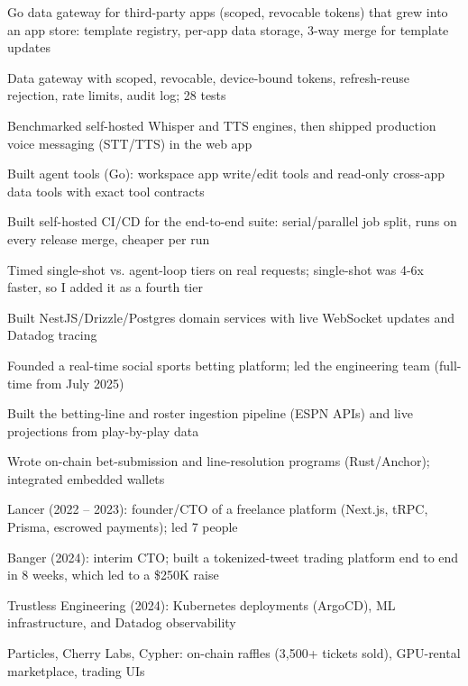\documentclass[print]{jack-resume}
\begin{document}
\begin{tightemize}
    \item Go data gateway for third-party apps (scoped, revocable tokens) that grew into an app store: template registry, per-app data storage, 3-way merge for template updates
    \item Data gateway with scoped, revocable, device-bound tokens, refresh-reuse rejection, rate limits, audit log; 28 tests
    \item Benchmarked self-hosted Whisper and TTS engines, then shipped production voice messaging (STT/TTS) in the web app
    \item Built agent tools (Go): workspace app write/edit tools and read-only cross-app data tools with exact tool contracts
    \item Built self-hosted CI/CD for the end-to-end suite: serial/parallel job split, runs on every release merge, cheaper per run
    \item Timed single-shot vs. agent-loop tiers on real requests; single-shot was 4-6x faster, so I added it as a fourth tier
\end{tightemize}
\sectionsep

\begin{tightemize}
    \item Built NestJS/Drizzle/Postgres domain services with live WebSocket updates and Datadog tracing
    \item Founded a real-time social sports betting platform; led the engineering team (full-time from July 2025)
    \item Built the betting-line and roster ingestion pipeline (ESPN APIs) and live projections from play-by-play data
    \item Wrote on-chain bet-submission and line-resolution programs (Rust/Anchor); integrated embedded wallets
\end{tightemize}
\sectionsep

\begin{tightemize}
    \item Lancer (2022 – 2023): founder/CTO of a freelance platform (Next.js, tRPC, Prisma, escrowed payments); led 7 people
    \item Banger (2024): interim CTO; built a tokenized-tweet trading platform end to end in 8 weeks, which led to a \$250K raise
    \item Trustless Engineering (2024): Kubernetes deployments (ArgoCD), ML infrastructure, and Datadog observability
    \item Particles, Cherry Labs, Cypher: on-chain raffles (3,500+ tickets sold), GPU-rental marketplace, trading UIs
\end{tightemize}
\sectionsep
\end{document}
